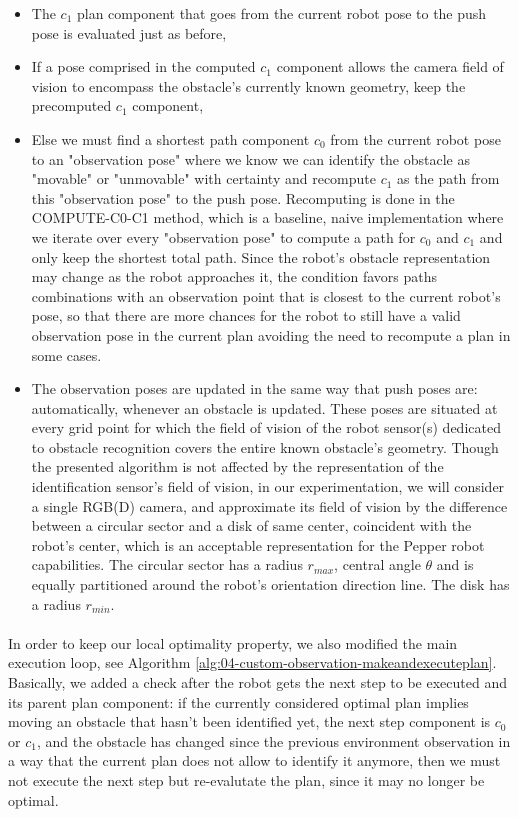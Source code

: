 \begin{itemize}
  \item The $c_{1}$ plan component that goes from the current robot pose to the push pose is evaluated just as before,
  \item If a pose comprised in the computed $c_{1}$ component allows the camera field of vision to encompass the obstacle's currently known geometry, keep the precomputed $c_{1}$ component,
  \item Else we must find a shortest path component $c_{0}$ from the current robot pose to an "observation pose" where we know we can identify the obstacle as "movable" or "unmovable" with certainty and recompute $c_{1}$ as the path from this "observation pose" to the push pose. Recomputing is done in the COMPUTE-C0-C1 method, which is a baseline, naive implementation where we iterate over every "observation pose" to compute a path for $c_{0}$ and $c_{1}$ and only keep the shortest total path. Since the robot's obstacle representation may change as the robot approaches it, the condition favors paths combinations with an observation point that is closest to the current robot's pose, so that there are more chances for the robot to still have a valid observation pose in the current plan avoiding the need to recompute a plan in some cases.
  \item The observation poses are updated in the same way that push poses are: automatically, whenever an obstacle is updated. These poses are situated at every grid point for which the field of vision of the robot sensor(s) dedicated to obstacle recognition covers the entire known obstacle's geometry. Though the presented algorithm is not affected by the representation of the identification sensor's field of vision, in our experimentation, we will consider a single RGB(D) camera, and approximate its field of vision by the difference between a circular sector and a disk of same center, coincident with the robot's center, which is an acceptable representation for the Pepper robot capabilities. The circular sector has a radius $r_{max}$, central angle $\theta$ and is equally partitioned around the robot's orientation direction line. The disk has a radius $r_{min}$.
\end{itemize}

\paragraph{} In order to keep our local optimality property, we also modified the main execution loop, see Algorithm \ref{alg:04-custom-observation-makeandexecuteplan}. Basically, we added a check after the robot gets the next step to be executed and its parent plan component: if the currently considered optimal plan implies moving an obstacle that hasn't been identified yet, the next step component is $c_{0}$ or $c_{1}$, and the obstacle has changed since the previous environment observation in a way that the current plan does not allow to identify it anymore, then we must not execute the next step but re-evalutate the plan, since it may no longer be optimal.

